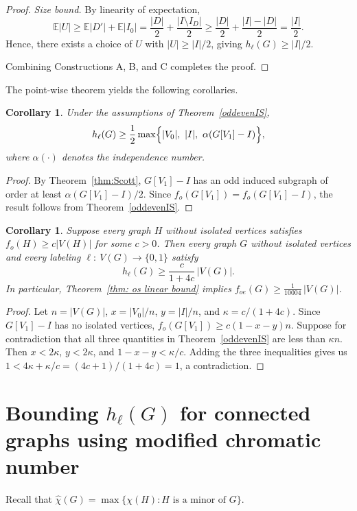 \documentclass{article}
\newcommand{\mchi}{\hat{\chi}}
\newcommand{\2}{\vspace{0.2cm}}
\newtheorem{corollary}[theorem]{Corollary}
\begin{document}
\begin{proof}
\emph{Size bound.} By linearity of expectation,
$$
\mathbb{E}|U|\ge\mathbb{E}|D'|+\mathbb{E}|I_0|=\frac{|D|}{2}+\frac{|I\setminus I_D|}{2}\ge
\frac{|D|}{2}+\frac{|I|-|D|}{2}=\frac{|I|}{2}.
$$
Hence, there exists a choice of $U$ with $|U|\ge |I|/2$, giving $h_{\ell}(G)\ge|I|/2$.

Combining Constructions A, B, and C completes the proof.
\end{proof}

The point-wise theorem yields the following corollaries.

\begin{corollary}\label{cor:Scott-bound}
Under the assumptions of Theorem~\ref{oddevenIS},
$$
h_{\ell}(G)\ge \frac{1}{2}\max\Bigl\{|V_0|,\ |I|,\ \alpha(G[V_1]-I)\Bigr\},
$$
where $\alpha(\cdot)$ denotes the independence number.
\end{corollary}
\begin{proof}
By Theorem~\ref{thm:Scott}, $G[V_1]-I$ has an odd induced subgraph of order at least $\alpha(G[V_1]-I)/2$. Since $f_o(G[V_1])=f_o(G[V_1]-I)$, the result follows from Theorem~\ref{oddevenIS}.
\end{proof}

\begin{corollary}\label{cor:universal}
Suppose every graph $H$ without isolated vertices satisfies $f_o(H)\ge c|V(H)|$ for some $c>0$. Then every graph $G$ without isolated vertices and every labeling $\ell:\ V(G)\to\{0,1\}$ satisfy
$$
h_{\ell}(G)\ge \frac{c}{1+4c}\,|V(G)|.
$$
In particular, Theorem~\ref{thm: os linear bound} implies $f_{oe}(G)\ge \frac{1}{10004}\,|V(G)|$.
\end{corollary}
\begin{proof}
Let $n=|V(G)|$, $x=|V_0|/n$, $y=|I|/n$, and $\kappa=c/(1+4c)$. Since $G[V_1]-I$ has no isolated vertices, $f_o(G[V_1])\ge c(1-x-y)n$. Suppose for contradiction that all three quantities in Theorem~\ref{oddevenIS} are less than $\kappa n$. Then $x<2\kappa$, $y<2\kappa$, and $1-x-y<\kappa/c$. Adding the three inequalities gives us $1<4\kappa+\kappa/c=(4c+1)/(1+4c)=1$, a contradiction.
\end{proof}

\section{Bounding $h_{\ell}(G)$ for connected graphs using modified chromatic number}\label{sec:trees}

Recall that $\mchi(G)=\max\{\chi(H): H \text{ is a minor of } G\}.$
\end{document}

